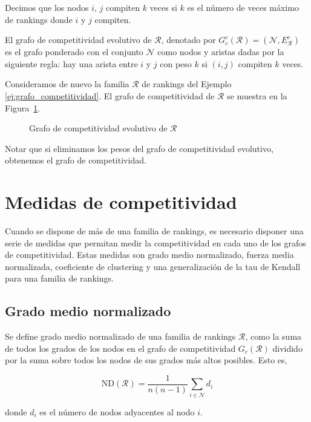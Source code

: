 \begin{defi}
Decimos que los nodos $i$, $j$ compiten $k$ veces si $k$ es el número de veces máximo de rankings donde $i$ y $j$ compiten.
\end{defi}

\begin{defi}
El grafo de competitividad evolutivo de $\mathcal{R}$, denotado por $G_c^e(\mathcal{R}) = (\mathcal{N}, E_\mathcal{R}^e)$ es el grafo ponderado con el conjunto $\mathcal{N}$ como nodos y aristas dadas por la siguiente regla: hay una arista entre $i$ y $j$ con peso $k$ si $(i,j)$ compiten $k$ veces.
\end{defi}

\begin{ejemplo}
Consideramos de nuevo la familia $\mathcal{R}$ de rankings del Ejemplo \ref{ej:grafo_competitividad}. El grafo de competitividad de $\mathcal{R}$ se muestra en la Figura~\ref{fig:grafo_competitividad_evolutivo}.

\begin{figure}[htb]
\centering
\ejemplografocompetitividadevolutivo
\caption[Grafo de competitividad evolutivo]{Grafo de competitividad evolutivo de $\mathcal{R}$}
\label{fig:grafo_competitividad_evolutivo}
\end{figure}

\end{ejemplo}

Notar que si eliminamos los pesos del grafo de competitividad evolutivo, obtenemos el grafo de competitividad.

\section{Medidas de competitividad}

Cuando se dispone de más de una familia de rankings, es necesario disponer una serie de medidas que permitan medir la competitividad en cada uno de los grafos de competitividad. Estas medidas son grado medio normalizado, fuerza media normalizada, coeficiente de clustering y una generalización de la tau de Kendall para una familia de rankings.

\subsection*{Grado medio normalizado}

\begin{defi}
Se define grado medio normalizado de una familia de rankings $\mathcal{R}$, como la suma de todos los grados de los nodos en el grafo de competitividad $G_c(\mathcal{R})$ dividido por la suma sobre todos los nodos de sus grados más altos posibles. Esto es,

\begin{equation}
\mathrm{ND}(\mathcal{R}) = \dfrac{1}{n(n-1)} \sum_{i \in \mathcal{N}} d_i
\end{equation}

donde $d_i$ es el número de nodos adyacentes al nodo  $i$.
\end{defi}

